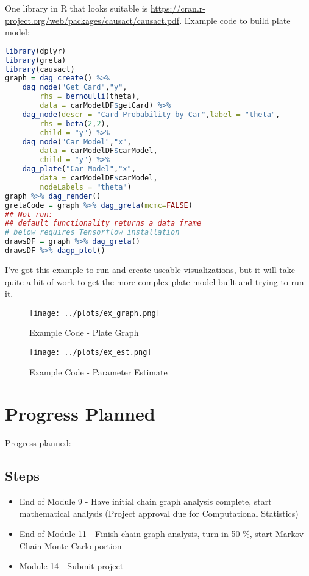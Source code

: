 \documentclass[a4paper, 11pt]{report}
\begin{document}
One library in R that looks suitable is \url{https://cran.r-project.org/web/packages/causact/causact.pdf}. Example code to build plate model:
\begin{lstlisting}[language=R]
library(dplyr)
library(greta)
library(causact)
graph = dag_create() %>%
	dag_node("Get Card","y",
		rhs = bernoulli(theta),
		data = carModelDF$getCard) %>%
	dag_node(descr = "Card Probability by Car",label = "theta",
		rhs = beta(2,2),
		child = "y") %>%
	dag_node("Car Model","x",
		data = carModelDF$carModel,
		child = "y") %>%
	dag_plate("Car Model","x",
		data = carModelDF$carModel,
		nodeLabels = "theta")
graph %>% dag_render()
gretaCode = graph %>% dag_greta(mcmc=FALSE)
## Not run:
## default functionality returns a data frame
# below requires Tensorflow installation
drawsDF = graph %>% dag_greta()
drawsDF %>% dagp_plot()
\end{lstlisting}
I've got this example to run and create useable visualizations, but it will take quite a bit of work to get the more complex plate model built and trying to run it.
\begin{figure}[h!]
	\caption{Example Code - Plate Graph}
	\label{ex_info}
	\texttt{[image: ../plots/ex\_graph.png]}
\end{figure}

\begin{figure}[h!]
	\caption{Example Code - Parameter Estimate}
	\label{ex_info}
	\texttt{[image: ../plots/ex\_est.png]}
\end{figure}

\chapter{Progress Planned}



\noindent Progress planned:
\section{Steps}
\begin{itemize}
\item End of Module 9 - Have initial chain graph analysis complete, start mathematical analysis (Project approval due for Computational Statistics)
\item End of Module 11 - Finish chain graph analysis, turn in 50 \%, start Markov Chain Monte Carlo portion
\item Module 14 - Submit project
\end{itemize}
\end{document}
